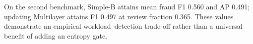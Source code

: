 On the second benchmark, Simple-B attains mean fraud F1 0.560 and AP 0.491; updating Multilayer attains F1 0.497 at review fraction 0.365. These values demonstrate an empirical workload--detection trade-off rather than a universal benefit of adding an entropy gate.
